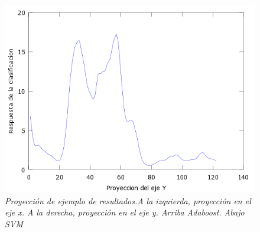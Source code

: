 \begin{figure}[htc]
  \includegraphics[scale=.4]{images/plots/svm5Y}
 \caption{\em  Proyección de ejemplo de resultados.A la izquierda, proyección en el eje x. A la derecha, proyección en el eje y. Arriba Adaboost. Abajo SVM}   
 \label{fig:pro5}
\end{figure}

